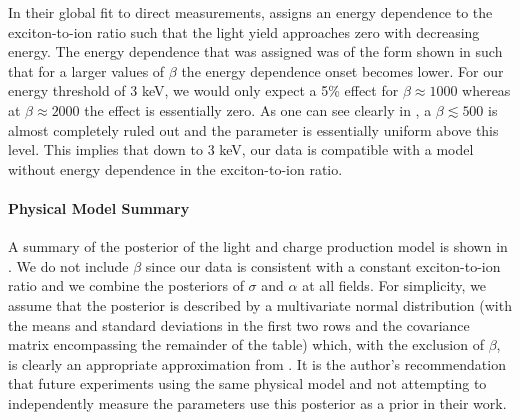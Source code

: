 In their global fit to direct measurements,  assigns an energy dependence to the exciton-to-ion ratio such that the light yield approaches zero with decreasing energy.  The energy dependence that was assigned was of the form shown in  such that for a larger values of $\beta$ the energy dependence onset becomes lower.  For our energy threshold of 3 keV, we would only expect a 5\% effect for $\beta \approx 1000$ whereas at $\beta \approx 2000$ the effect is essentially zero.  As one can see clearly in , a $\beta \lesssim 500$ is almost completely ruled out and the parameter is essentially uniform above this level.  This implies that down to 3 keV, our data is compatible with a model without energy dependence in the exciton-to-ion ratio.  


\paragraph{Physical Model Summary}

A summary of the posterior of the light and charge production model is shown in .  We do not include $\beta$ since our data is consistent with a constant exciton-to-ion ratio and we combine the posteriors of $\sigma$ and $\alpha$ at all fields.  For simplicity, we assume that the posterior is described by a multivariate normal distribution (with the means and standard deviations in the first two rows and the covariance matrix encompassing the remainder of the table) which, with the exclusion of $\beta$, is clearly an appropriate approximation from . It is the author's recommendation that future experiments using the same physical model and not attempting to independently measure the parameters use this posterior as a prior in their work.

